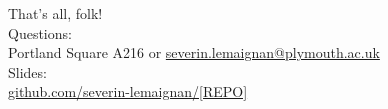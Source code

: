 \documentclass[compress]{beamer}
\begin{document}
\begin{frame}{}
    \begin{center}
        \Large
        That's all, folk!\\[2em]
        \normalsize
        Questions:\\
        Portland Square A216 or \url{severin.lemaignan@plymouth.ac.uk} \\[1em]

        Slides:\\ \url{github.com/severin-lemaignan/[REPO]}

    \end{center}
\end{frame}
\end{document}
